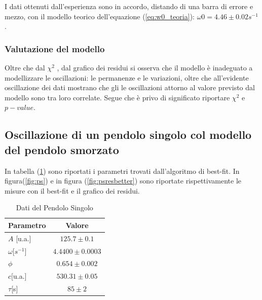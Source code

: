 \documentclass{article}
\begin{document}
            I dati ottenuti dall'esperienza sono in accordo, distando di  una barra di errore e mezzo, con il modello teorico dell'equazione (\ref{eq:w0_teoria}):  $\omega0=4.46 \pm 0.02 s^{-1}$.

            \subsubsection{Valutazione del modello}
            
             Oltre che dal $\chi^2$ , dal grafico dei residui si osserva che il modello è inadeguato a modellizzare le oscillazioni: le permanenze e le variazioni, oltre che all'evidente oscillazione dei dati mostrano che gli le oscillazioni attorno al valore previsto dal modello sono tra loro correlate.
             Segue che è privo di significato riportare $\chi^2$ e $p-value$.


\subsection{ Oscillazione di un pendolo singolo col modello del pendolo smorzato}
              In tabella (\ref{tab:pendolosingolobetter}) sono riportati i parametri trovati dall'algoritmo di best-fit.
              In figura(\ref{fig:ps}) e in figura (\ref{fig:psresbetter}) sono riportate rispettivamente  le misure con il best-fit e il grafico dei residui.



                \begin{table}[h! ]
                        \centering
                        \caption{Dati del Pendolo Singolo}
                        \begin{tabular}{|l|c|}
                        \hline
                        Parametro & Valore \\
                        \hline
                        $A$ [u.a.]& $125.7 \pm 0.1$ \\
                        $\omega$[$s^{-1}$] & $4.4400 \pm 0.0003$ \\
                        $\phi$ & $0.654 \pm 0.002$ \\
                        $c$[u.a.]  & $530.31 \pm0.05$ \\
                        $\tau$[s]  & $85 \pm 2$ \\
                        \hline
                        \end{tabular}
                        
                        \label{tab:pendolosingolobetter}

                \end{table}
\end{document}
